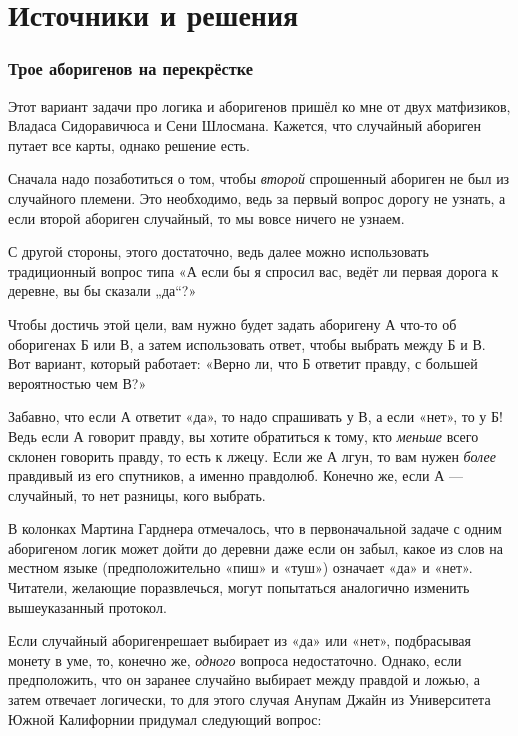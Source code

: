 \section*{Источники и решения}

\subsubsection*{Трое аборигенов на перекрёстке}

Этот вариант задачи про логика и аборигенов пришёл ко мне от двух матфизиков, Владаса Сидоравичюса и Сени Шлосмана.
Кажется, что случайный абориген путает все карты, однако решение есть.

Сначала надо позаботиться о том, чтобы \emph{второй} спрошенный абориген не был из случайного племени.
Это необходимо, ведь за первый вопрос дорогу не узнать, а если второй абориген случайный, то мы вовсе ничего не узнаем.

С другой стороны, этого достаточно, ведь далее можно использовать традиционный вопрос типа «А если бы я спросил вас, ведёт ли первая дорога к деревне, вы бы сказали „да“?»

Чтобы достичь этой цели, вам нужно будет задать аборигену А что-то об оборигенах Б или В, а затем использовать ответ, чтобы выбрать между Б и В.
Вот вариант, который работает: «Верно ли, что Б ответит правду, с большей вероятностью чем В?»

Забавно, что если А ответит «да», то надо спрашивать у В, а если «нет», то у Б!
Ведь если А говорит правду, вы хотите обратиться к тому, кто \emph{меньше} всего склонен говорить правду, то есть к лжецу.
Если же А лгун, то вам нужен \emph{более} правдивый из его спутников, а именно правдолюб.
Конечно же, если А --- случайный, то нет разницы, кого выбрать.

В колонках Мартина Гарднера отмечалось, что в первоначальной задаче с одним аборигеном логик может дойти до деревни даже если он забыл, какое из слов на местном языке (предположительно «пиш» и «туш») означает «да» и «нет».
Читатели, желающие поразвлечься, могут попытаться аналогично изменить вышеуказанный протокол.

Если случайный аборигенрешает выбирает из «да» или «нет», подбрасывая монету в уме, то, конечно же, \emph{одного} вопроса недостаточно.
Однако, если предположить, что он заранее случайно выбирает между правдой и ложью, а затем отвечает логически,
то для этого случая Анупам Джайн из Университета Южной Калифорнии придумал следующий вопрос:

